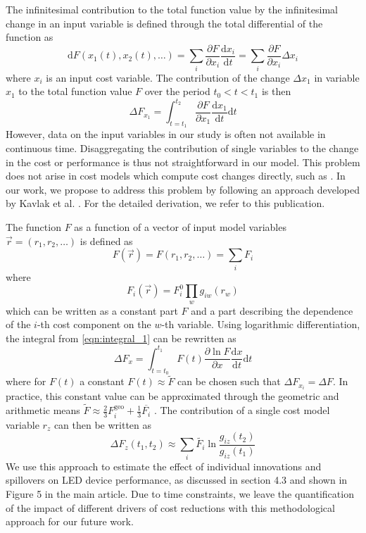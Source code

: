 \documentclass[parskip=full]{article}
\begin{document}
The infinitesimal contribution to the total function value by the infinitesimal change in an input variable is defined through the total differential of the function as
%
\begin{equation}
\text{d}F(x_1 (t), x_2(t), \dots) = \sum_i \frac{\partial F }{\partial x_i}     \frac{\text{d}x_i}{\text{d}t} = \sum_i \frac{\partial F }{\partial x_i}  \Delta x_i
\end{equation}
%
where $x_i$ is an input cost variable. The contribution of the change $\Delta x_1$ in variable $x_1$ to the total function value $F$ over the period $t_0 < t < t_1 $ is then
%
\begin{equation}
\Delta F_{x_1} = \int_{t=t_1}^{t_2} \frac{\partial F }{\partial x_1} \frac{\text{d}x_1}{\text{d}t} \text{d}t
\label{eqn:integral_1}
\end{equation}
%
However, data on the input variables in our study is often not available in continuous time. Disaggregating the contribution of single variables to the change in the cost or performance is thus not straightforward in our model. This problem does not arise in cost models which compute cost changes directly, such as \cite{nemet2012solar} \cite{goodrich2013assessing}. In our work, we propose to address this problem by following an approach developed by Kavlak et al. \cite{kavlak2018evaluating}. For the detailed derivation, we refer to this publication.

The function $F$ as a function of a vector of input model variables $\vec{r}=(r_1,r_2,\dots)$ is defined as
%
\begin{equation}
    F(\vec{r}) = F(r_1,r_2, \dots) = \sum_i F_i
\end{equation}
where
\begin{equation}
    F_i(\vec{r}) = F_i^0 \prod_w g_{iw}(r_w)
\end{equation}
%
which can be written as a constant part $F$ and a part describing the dependence of the $i$-th cost component on the $w$-th variable.
%
Using logarithmic differentiation, the integral from  \cref{eqn:integral_1} can be rewritten as
\begin{equation}
    \Delta F_x = \int_{t=t_0}^{t_1} F(t) \frac{ \partial \ln F }{ \partial x } \frac{ \text{d} x }{ \text{d} t} \text{d} t
\end{equation}
%
where for $F(t)$ a constant $F(t) \approx \tilde{F} $ can be chosen such that $\Delta F_{x_i} = \Delta F$. In practice, this constant value can be approximated through the geometric and arithmetic means $\tilde{F} \approx \frac{2}{3} F_i^\text{geo} + \frac{1}{3} \overline{F_i}$ \cite{kavlak2018evaluating}. The contribution of a single cost model variable $r_z$ can then be written as
%
\begin{equation}
    \Delta F_z (t_1,t_2) \approx \sum_i \tilde{F_i} \ln \frac{g_{iz}(t_2)}{g_{iz}(t_1)}
\end{equation}
%
We use this approach to estimate the effect of individual innovations and spillovers on LED device performance, as discussed in section 4.3 and shown in Figure 5 in the main article. Due to time constraints, we leave the quantification of the impact of different drivers of cost reductions with this methodological approach for our future work.
\end{document}
